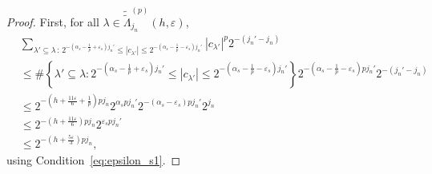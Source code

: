 \documentclass[10pt,a4paper]{amsart}
\newcommand{\modu}[1]{\left\vert{#1}\right\vert}
\begin{document}
\begin{proof}
    First, for all $\lambda\in \widetilde{\widetilde{\Lambda}}_{j_n}^{(p)}(h,\varepsilon)$, 
    \begin{align*}
        & \sum_{\lambda'\subseteq\lambda \,:\, 2^{-\left(\alpha_s-\frac{1}{p}+\varepsilon_s\right)j_n'} \leq \modu{c_{\lambda'}} \leq 2^{-\left(\alpha_s-\frac{1}{p}-\varepsilon_s\right)j_n'}} \modu{c_{\lambda'}}^p2^{-(j_n'-j_n)} \\
        & \leq \#\left\{\lambda'\subseteq\lambda :2^{-\left(\alpha_s-\frac{1}{p}+\varepsilon_s\right)j_n'} \leq \modu{c_{\lambda'}} \leq 2^{-\left(\alpha_s-\frac{1}{p}-\varepsilon_s\right)j_n'}\right\} 2^{-\left(\alpha_s-\frac{1}{p}-\varepsilon_s\right)pj_n'}2^{-(j_n'-j_n)} \\
        & \leq 2^{-\left(h+\frac{11\varepsilon}{6}+\frac{1}{p}\right)pj_n}2^{\alpha_spj_n'}2^{-(\alpha_s-\varepsilon_s)pj_n'}2^{j_n} \\
        & \leq 2^{-\left(h+\frac{11\varepsilon}{6}\right)pj_n}2^{\varepsilon_spj_n'} \\
        & \leq 2^{-\left(h+\frac{5\varepsilon}{3}\right)pj_n},
    \end{align*}
    using Condition~\eqref{eq:epsilon_s1}.


\end{proof}
\end{document}
